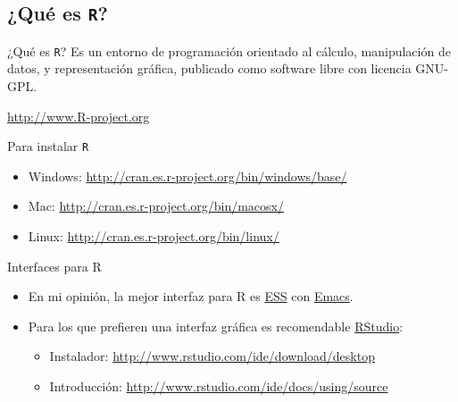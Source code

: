 \documentclass[xcolor={usenames,svgnames,dvipsnames}]{beamer}
\begin{document}
\subsection{¿Qué es \texttt{R}?}
\label{sec:orgheadline17}
\begin{frame}[fragile,label={sec:orgheadline8}]{¿Qué es \texttt{R}?}
 Es un entorno de programación orientado al cálculo, manipulación de datos, y representación gráfica, publicado como software libre con licencia GNU-GPL.
\begin{center}
\url{http://www.R-project.org} 
\end{center}
\end{frame}

\begin{frame}[fragile,label={sec:orgheadline9}]{Para instalar \texttt{R}}
 \begin{itemize}
\item Windows: \url{http://cran.es.r-project.org/bin/windows/base/}
\item Mac: \url{http://cran.es.r-project.org/bin/macosx/}
\item Linux: \url{http://cran.es.r-project.org/bin/linux/}
\end{itemize}
\end{frame}

\begin{frame}[label={sec:orgheadline10}]{Interfaces para R}
\begin{itemize}
\item En mi opinión, la mejor interfaz para R es \href{http://ess.r-project.org/}{ESS} con \href{http://www.gnu.org/software/emacs/}{Emacs}.
\item Para los que prefieren una interfaz gráfica es recomendable \href{http://www.rstudio.com/ide/}{RStudio}:
\begin{itemize}
\item Instalador: \url{http://www.rstudio.com/ide/download/desktop}
\item Introducción: \url{http://www.rstudio.com/ide/docs/using/source}
\end{itemize}
\end{itemize}
\end{frame}
\end{document}
